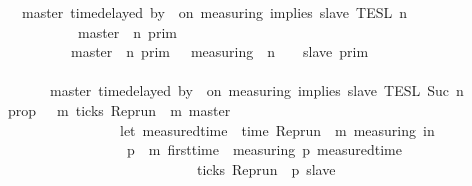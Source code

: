 \begin{isabellebody}
\ \ {\isacartoucheopen}{\isasymlbrakk}\ master\ time{\isacharminus}delayed\ by\ {\isasymdelta}{\isasymtau}\ on\ measuring\ implies\ slave\ {\isasymrbrakk}\isactrlsub T\isactrlsub E\isactrlsub S\isactrlsub L\isactrlbsup {\isasymge}\ n\isactrlesup \ {\isacharequal}\isanewline
\ \ \ \ \ {\isacharparenleft}\ \ \ \ \ {\isasymlbrakk}\ master\ {\isasymnot}{\isasymUp}\ n\ {\isasymrbrakk}\isactrlsub p\isactrlsub r\isactrlsub i\isactrlsub m\ \ \ \ \ \ \ \ \ \ \ \ \ \ \ %
\isanewline
\ \ \ \ \ \ \ \ {\isasymunion}\ {\isacharparenleft}{\isasymlbrakk}\ master\ {\isasymUp}\ n\ {\isasymrbrakk}\isactrlsub p\isactrlsub r\isactrlsub i\isactrlsub m\ {\isasyminter}\ {\isasymlbrakk}\ measuring\ {\isacharat}\ n\ {\isasymoplus}\ {\isasymdelta}{\isasymtau}\ {\isasymRightarrow}\ slave\ {\isasymrbrakk}\isactrlsub p\isactrlsub r\isactrlsub i\isactrlsub m{\isacharparenright}{\isacharparenright}\isanewline
\ \ \ \ \ \ \ \ \ \ \ \ \ \ \ \ \ \ \ \ \ \ \ \ \ \ \ \ \ \ \ \ \ \ \ \ \ \ \ \ \ \ \ \ \ %
\isanewline
\ \ \ \ \ {\isasyminter}\ {\isasymlbrakk}\ master\ time{\isacharminus}delayed\ by\ {\isasymdelta}{\isasymtau}\ on\ measuring\ implies\ slave\ {\isasymrbrakk}\isactrlsub T\isactrlsub E\isactrlsub S\isactrlsub L\isactrlbsup {\isasymge}\ Suc\ n\isactrlesup {\isacartoucheclose}\isanewline
%
\isadelimproof
%
\endisadelimproof
%
\isatagproof
{}\isamarkupfalse%
\ {\isacharminus}\isanewline
\ \ \isamarkupfalse%
\ {\isacharquery}prop\ {\isacharequal}\ {\isacartoucheopen}{\isasymlambda}{\isasymrho}\ m{\isachardot}\ ticks\ {\isacharparenleft}{\isacharparenleft}Rep{\isacharunderscore}run\ {\isasymrho}{\isacharparenright}\ m\ master{\isacharparenright}\ {\isasymlongrightarrow}\isanewline
\ \ \ \ \ \ \ \ \ \ \ \ \ \ \ \ \ {\isacharparenleft}let\ measured{\isacharunderscore}time\ {\isacharequal}\ time\ {\isacharparenleft}{\isacharparenleft}Rep{\isacharunderscore}run\ {\isasymrho}{\isacharparenright}\ m\ measuring{\isacharparenright}\ in\isanewline
\ \ \ \ \ \ \ \ \ \ \ \ \ \ \ \ \ \ {\isasymforall}p\ {\isasymge}\ m{\isachardot}\ first{\isacharunderscore}time\ {\isasymrho}\ measuring\ p\ {\isacharparenleft}measured{\isacharunderscore}time\ {\isacharplus}\ {\isasymdelta}{\isasymtau}{\isacharparenright}\isanewline
\ \ \ \ \ \ \ \ \ \ \ \ \ \ \ \ \ \ \ \ \ \ \ \ \ \ \ {\isasymlongrightarrow}\ ticks\ {\isacharparenleft}{\isacharparenleft}Rep{\isacharunderscore}run\ {\isasymrho}{\isacharparenright}\ p\ slave{\isacharparenright}{\isacharparenright}{\isacartoucheclose}\isanewline

\end{isabellebody}

